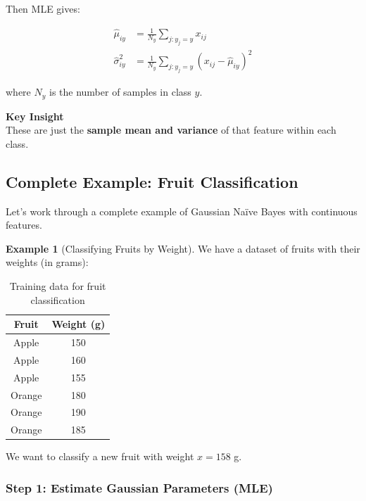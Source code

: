 \documentclass[11pt,a4paper]{article}
\theoremstyle{definition}
\newtheorem{example}{Example}[section]
\theoremstyle{plain}
\theoremstyle{remark}
\begin{document}
Then MLE gives:

\begin{tcolorbox}[colback=green!5!white,colframe=green!75!black,title=\textbf{Gaussian MLE Parameters}]
\begin{align}
\hat{\mu}_{iy} &= \frac{1}{N_y} \sum_{j: y_j = y} x_{ij} \\
\hat{\sigma}_{iy}^2 &= \frac{1}{N_y} \sum_{j: y_j = y} (x_{ij} - \hat{\mu}_{iy})^2
\end{align}

where $N_y$ is the number of samples in class $y$.
\end{tcolorbox}

\begin{center}
\colorbox{cyan!15}{\parbox{0.9\textwidth}{
\centering
\textbf{Key Insight}\\[0.2cm]
These are just the \textbf{sample mean and variance} of that feature within each class.
}}
\end{center}

\subsection{Complete Example: Fruit Classification}

Let's work through a complete example of Gaussian Naïve Bayes with continuous features.

\begin{example}[Classifying Fruits by Weight]
We have a dataset of fruits with their weights (in grams):

\begin{table}[h]
\centering
\begin{tabular}{|c|c|}
\hline
\textbf{Fruit} & \textbf{Weight (g)} \\
\hline
Apple & 150 \\
Apple & 160 \\
Apple & 155 \\
Orange & 180 \\
Orange & 190 \\
Orange & 185 \\
\hline
\end{tabular}
\caption{Training data for fruit classification}
\end{table}

We want to classify a new fruit with weight $x = 158$ g.
\end{example}

\subsubsection{Step 1: Estimate Gaussian Parameters (MLE)}
\end{document}
